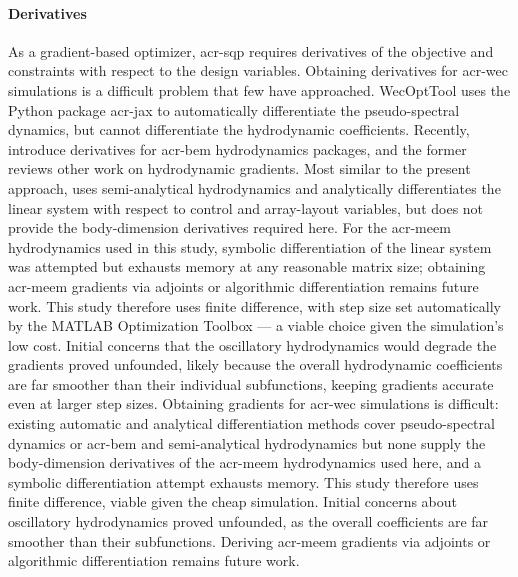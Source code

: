 \paragraph{Derivatives}
As a gradient-based optimizer, \gls{acr-sqp} requires derivatives of the objective and constraints with respect to the design variables.
\ifdefined\DISSERTATION
    Obtaining derivatives for \gls{acr-wec} simulations is a difficult problem that few have approached.
    WecOptTool uses the Python package \gls{acr-jax} \citep{bradbury_jax_2018} to automatically differentiate the pseudo-spectral dynamics, but cannot differentiate the hydrodynamic coefficients.
    Recently, \citet{rohrer_analytical_2024,khanal_fully_2025} introduce derivatives for \gls{acr-bem} hydrodynamics packages, and the former reviews other work on hydrodynamic gradients.
    Most similar to the present approach, \citet{gambarini_gradient_2024} uses semi-analytical hydrodynamics and analytically differentiates the linear system with respect to control and array-layout variables, but does not provide the body-dimension derivatives required here.
    For the \gls{acr-meem} hydrodynamics used in this study, symbolic differentiation of the linear system was attempted but exhausts memory at any reasonable matrix size; obtaining \gls{acr-meem} gradients via adjoints or algorithmic differentiation remains future work.
    This study therefore uses finite difference, with step size set automatically by the MATLAB Optimization Toolbox --- a viable choice given the simulation's low cost.
    Initial concerns that the oscillatory hydrodynamics would degrade the gradients \citep{mccabe_open-source_2024} proved unfounded, likely because the overall hydrodynamic coefficients are far smoother than their individual subfunctions, keeping gradients accurate even at larger step sizes.
\else
    Obtaining gradients for \gls{acr-wec} simulations is difficult:
    existing automatic and analytical differentiation methods cover pseudo-spectral dynamics \citep{bradbury_jax_2018}
    or \gls{acr-bem} and semi-analytical hydrodynamics \citep{rohrer_analytical_2024,khanal_fully_2025,gambarini_gradient_2024}
    but none supply the body-dimension derivatives of the \gls{acr-meem} hydrodynamics used here,
    and a symbolic differentiation attempt exhausts memory.
    This study therefore uses finite difference, viable given the cheap simulation.
    Initial concerns about oscillatory hydrodynamics \citep{mccabe_open-source_2024} proved unfounded,
    as the overall coefficients are far smoother than their subfunctions.
    Deriving \gls{acr-meem} gradients via adjoints or algorithmic differentiation remains future work.
\fi

